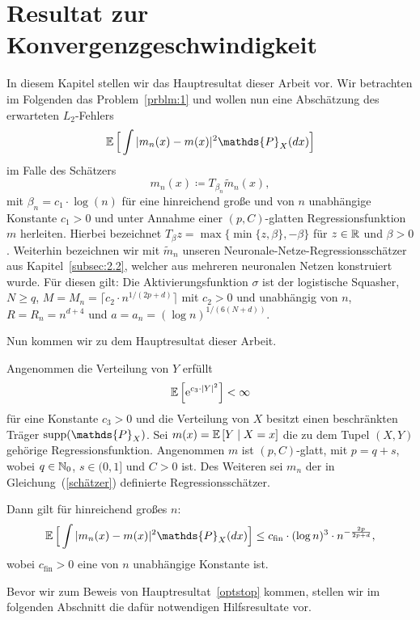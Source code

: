 \chapter{Resultat zur Konvergenzgeschwindigkeit}
\label{chap:3}

In diesem Kapitel stellen wir das Hauptresultat dieser Arbeit vor.
Wir betrachten im Folgenden das Problem~{\ref{prblm:1}} und wollen nun eine Abschätzung des erwarteten $L_2$-Fehlers 
$$\E \Big[\int |m_n(x) - m(x)|^2  \mathds{P}_X(dx)\Big]$$
im Falle des Schätzers 
\begin{equation}
\label{schätzer}
m_n(x) \coloneqq T_{\beta_n}\tilde{m}_n (x),
\end{equation}
mit $\beta_n = c_1 \cdot \log(n)$ für eine hinreichend große und von $n$ unabhängige Konstante $c_1 > 0$ und unter Annahme einer $(p,C)$-glatten Regressionsfunktion $m$ herleiten. Hierbei bezeichnet $T_{\beta}z = \max\{\min\{z, \beta\}, -\beta\}$
für $z \in \mathbb{R}$ und $\beta > 0$. Weiterhin bezeichnen wir mit $\tilde{m}_n$ unseren Neuronale-Netze-Regressionsschätzer aus Kapitel~\ref{subsec:2.2}, welcher aus mehreren neuronalen Netzen konstruiert wurde. Für diesen gilt: 
Die Aktivierungsfunktion $\sigma$ ist der logistische Squasher, $N \geq q$, $M = M_n = \lceil c_2 \cdot n^{1/(2p + d)}\rceil$ mit $c_2 >0$ und unabhängig von $n$, $R = R_n = n^{d + 4}$ und $a = a_n = (\log n)^{1/(6(N + d))}.$

Nun kommen wir zu dem Hauptresultat dieser Arbeit.
\begin{samepage}
\begin{mthm}
\label{optstop}
Angenommen die Verteilung von $Y$ erfüllt 
$$ \mathbb{E}\,\Big[\mathrm{e}^{c_3 \cdot |Y|^2}\Big] < \infty$$
für eine Konstante $c_3 > 0$ und die Verteilung von $X$ besitzt einen beschränkten Träger $\supp(\mathds{P}_X)$. Sei $m(x) = \mathbb{E}\,[Y \mid X = x]$ die zu dem Tupel $(X, Y)$ gehörige Regressionsfunktion.
Angenommen $m$ ist $(p,C)$-glatt, mit $p = q + s$, wobei $q \in \mathbb{N}_0$, $s \in (0,1]$ und $C > 0$ ist. Des Weiteren sei $m_n$ der in Gleichung~(\ref{schätzer}) definierte Regressionsschätzer.

Dann gilt für hinreichend großes $n$:
$$\E \Big[\int |m_n(x) - m(x)|^2  \mathds{P}_X(dx)\Big] \leq c_{\mathrm{fin}} \cdot (\log n)^3 \cdot n^{- \frac{2p}{2p + d}},$$
wobei $c_{\mathrm{fin}} > 0$ eine von $n$ unabhängige Konstante ist.
\end{mthm}
\end{samepage}

Bevor wir zum Beweis von Hauptresultat~\ref{optstop} kommen, stellen wir im folgenden Abschnitt die dafür notwendigen Hilfsresultate vor.

